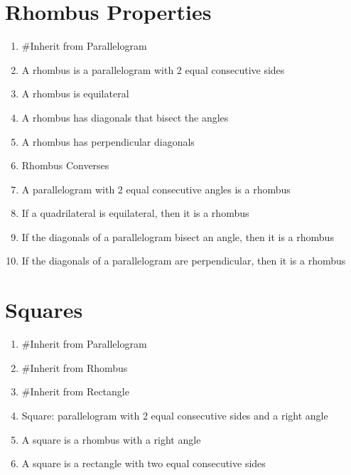 \section*{Rhombus Properties}
\begin{enumerate}
    \item \#Inherit from Parallelogram
    \item A rhombus is a parallelogram with 2 equal consecutive sides
    \item A rhombus is equilateral
    \item A rhombus has diagonals that bisect the angles
    \item A rhombus has perpendicular diagonals
    \item Rhombus Converses
    \item A parallelogram with 2 equal consecutive angles is a rhombus
    \item If a quadrilateral is equilateral, then it is a rhombus
    \item If the diagonals of a parallelogram bisect an angle, then it is a rhombus
    \item If the diagonals of a parallelogram are perpendicular, then it is a rhombus
\end{enumerate}

\section*{Squares}
\begin{enumerate}
    \item \#Inherit from Parallelogram
    \item \#Inherit from Rhombus
    \item \#Inherit from Rectangle
    \item Square: parallelogram with 2 equal consecutive sides and a right angle
    \item A square is a rhombus with a right angle
    \item A square is a rectangle with two equal consecutive sides
\end{enumerate}


